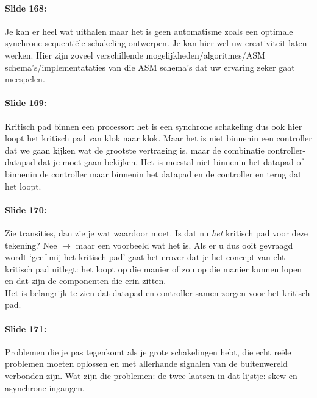\documentclass[10pt,a4paper]{book}
\begin{document}
\paragraph{Slide 168:} Je kan er heel wat uithalen maar het is geen automatisme zoals een optimale synchrone sequenti\"ele schakeling ontwerpen. Je kan hier wel uw creativiteit laten werken. Hier zijn zoveel verschillende mogelijkheden/algoritmes/ASM schema's/implementataties van die ASM schema's dat uw ervaring zeker gaat meespelen.

\paragraph{Slide 169:} Kritisch pad binnen een processor: het is een synchrone schakeling dus ook hier loopt het kritisch pad van klok naar klok. Maar het is niet binnenin een controller dat we gaan kijken wat de grootste vertraging is, maar de combinatie controller-datapad dat je moet gaan bekijken. Het is meestal niet binnenin het datapad of binnenin de controller maar binnenin het datapad en de controller en terug dat het loopt. 

\paragraph{Slide 170:} Zie transities, dan zie je wat waardoor moet. Is dat nu \emph{het} kritisch pad voor deze tekening? Nee $\rightarrow$ maar een voorbeeld wat het is. Als er u dus ooit gevraagd wordt `geef mij het kritisch pad' gaat het erover dat je het concept van eht kritisch pad uitlegt: het loopt op die manier of zou op die manier kunnen lopen en dat zijn de componenten die erin zitten.\\
Het is belangrijk te zien dat datapad en controller samen zorgen voor het kritisch pad.

\paragraph{Slide 171:} Problemen die je pas tegenkomt als je grote schakelingen hebt, die echt re\"ele problemen moeten oplossen en met allerhande signalen van de buitenwereld verbonden zijn. Wat zijn die problemen: de twee laatsen in dat lijstje: skew en asynchrone ingangen.
\end{document}
